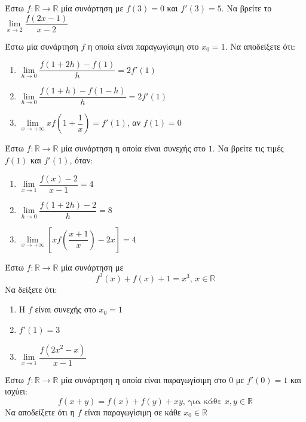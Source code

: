 \documentclass{presentation}
\begin{document}
\begin{askisi}
  Έστω $f:\mathbb{R}\to\mathbb{R}$ μία συνάρτηση με $f(3)=0$ και $f'(3)=5$. Να βρείτε το $\lim\limits_{x \to 2}{ \dfrac{f(2x-1)}{x-2} }$

\end{askisi}

\begin{askisi}
  Έστω μία συνάρτηση $f$ η οποία είναι παραγωγίσιμη στο $x_0=1$. Να αποδείξετε ότι:
  \begin{enumerate}
    \item<1-> $\lim\limits_{h \to 0}{ \dfrac{f(1+2h)-f(1)}{h} }=2f'(1)$
    \item<2-> $\lim\limits_{h \to 0}{ \dfrac{f(1+h)-f(1-h)}{h} }=2f'(1)$
    \item<3-> $\lim\limits_{x \to +\infty}{ xf\left( 1+\dfrac{1}{x} \right) }=f'(1)$, αν $f(1)=0$
  \end{enumerate}

\end{askisi}

\begin{askisi}
  Έστω $f:\mathbb{R}\to\mathbb{R}$ μία συνάρτηση η οποία είναι συνεχής στο $1$. Να βρείτε τις τιμές $f(1)$ και $f'(1)$, όταν:
  \begin{enumerate}
    \item<1-> $\lim\limits_{x \to 1}{ \dfrac{f(x)-2}{x-1} }=4$
    \item<2-> $\lim\limits_{h \to 0}{ \dfrac{f(1+2h)-2}{h} }=8$
    \item<3-> $\lim\limits_{x \to +\infty}{ \left[ xf\left( \dfrac{x+1}{x} \right)-2x   \right]=4  }$
  \end{enumerate}

\end{askisi}

\begin{askisi}
  Έστω $f:\mathbb{R}\to\mathbb{R}$ μία συνάρτηση με
  $$f^3(x)+f(x)+1=x^3 \text{, } x\in\mathbb{R}$$
  Να δείξετε ότι:
  \begin{enumerate}
    \item<1-> Η $f$ είναι συνεχής στο $x_0=1$
    \item<2-> $f'(1)=3$
    \item<3-> $\lim\limits_{x \to 1}{ \dfrac{f(2x^2-x)}{x-1}  }$
  \end{enumerate}

\end{askisi}

\begin{askisi}
  Έστω $f:\mathbb{R}\to\mathbb{R}$ μία συνάρτηση η οποία είναι παραγωγίσιμη στο $0$ με $f'(0)=1$ και ισχύει:
  $$f(x+y)=f(x)+f(y)+xy \text{, για κάθε } x,y\in\mathbb{R}$$
  Να αποδείξετε ότι η $f$ είναι παραγωγίσιμη σε κάθε $x_0\in\mathbb{R}$

\end{askisi}

\moodle
\end{document}
